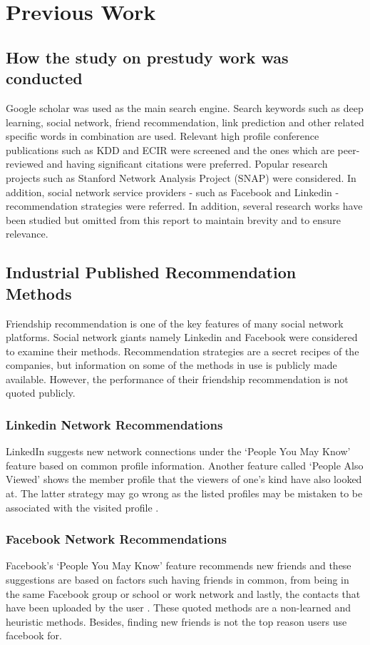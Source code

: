 \documentclass{kththesis}
\begin{document}
\section{Previous Work}
\subsection{How the study on prestudy work was conducted} 
Google scholar was used as the main search engine. Search keywords such as deep learning, social network, friend recommendation, link prediction and other related specific words in combination are used. Relevant high profile conference publications such as KDD and ECIR were screened and the ones which are peer-reviewed and having significant citations were preferred. Popular research projects such as Stanford Network Analysis Project (SNAP) \cite{snap} were considered. In addition, social network service providers - such as Facebook and Linkedin - recommendation strategies were referred. In addition, several research works have been studied but omitted from this report to maintain brevity and to ensure relevance.

\subsection{Industrial Published Recommendation Methods}
Friendship recommendation is one of the key features of many social network platforms. Social network giants namely Linkedin and Facebook were considered to examine their methods. Recommendation strategies are a secret recipes of the companies, but information on some of the methods in use is publicly made available. However, the performance of their friendship recommendation is not quoted publicly. 

\subsubsection{Linkedin Network Recommendations}
\noindent LinkedIn suggests new network connections under the `People You May Know' feature based on common profile information. Another feature called `People Also Viewed' shows the member profile that the viewers of one's kind have also looked at. The latter strategy may go wrong as the listed profiles may be mistaken to be associated with the visited profile \cite{linkedin}. 

\subsubsection{Facebook Network Recommendations}
\noindent Facebook's `People You May Know' feature recommends new friends and these suggestions are based on factors such having friends in common, from being in the same Facebook group or school or work network and lastly, the contacts that have been uploaded by the user \cite{facebook}. These quoted methods are a non-learned and heuristic methods. Besides, finding new friends is not the top reason users use facebook for. 
\end{document}
